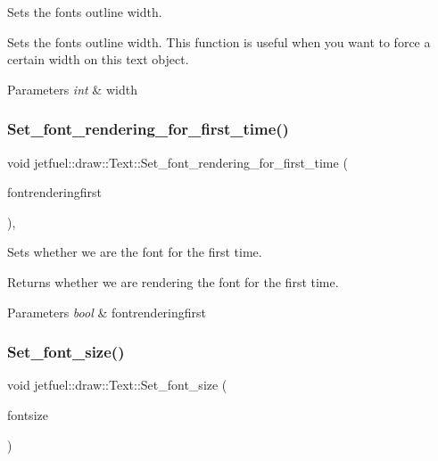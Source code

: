 Sets the font\textquotesingle{}s outline width. 

Sets the font\textquotesingle{}s outline width. This function is useful when you want to force a certain width on this text object.


\begin{DoxyParams}{Parameters}
{\em int} & width \\
\hline
\end{DoxyParams}
\mbox{\label{classjetfuel_1_1draw_1_1Text_ac5bcf85ef9195b5bba77441eeddf2f6c}} 
\subsubsection{\texorpdfstring{Set\+\_\+font\+\_\+rendering\+\_\+for\+\_\+first\+\_\+time()}{Set\_font\_rendering\_for\_first\_time()}}
{\footnotesize\ttfamily void jetfuel\+::draw\+::\+Text\+::\+Set\+\_\+font\+\_\+rendering\+\_\+for\+\_\+first\+\_\+time (\begin{DoxyParamCaption}\item[{bool}]{fontrenderingfirst }\end{DoxyParamCaption})\hspace{0.3cm}{\ttfamily [inline]}, {\ttfamily [protected]}}



Sets whether we are the font for the first time. 

Returns whether we are rendering the font for the first time.


\begin{DoxyParams}{Parameters}
{\em bool} & fontrenderingfirst \\
\hline
\end{DoxyParams}
\mbox{\label{classjetfuel_1_1draw_1_1Text_a488868c8aa0fcc692cd7a37b8abe13f2}} 
\subsubsection{\texorpdfstring{Set\+\_\+font\+\_\+size()}{Set\_font\_size()}}
{\footnotesize\ttfamily void jetfuel\+::draw\+::\+Text\+::\+Set\+\_\+font\+\_\+size (\begin{DoxyParamCaption}\item[{const unsigned int}]{fontsize }\end{DoxyParamCaption})\hspace{0.3cm}{\ttfamily [inline]}}



